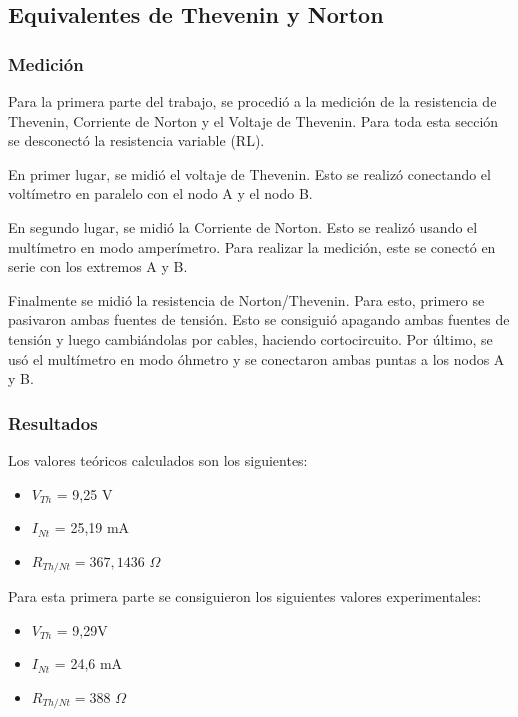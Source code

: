 \documentclass{article}
\begin{document}
        \subsection{Equivalentes de Thevenin y Norton}
            \subsubsection{Medición}
                \quad Para la primera parte del trabajo, se procedió a la medición de la resistencia de Thevenin, Corriente de Norton y el Voltaje de Thevenin. Para toda esta sección se desconectó la resistencia variable (RL).\par
                En primer lugar, se midió el voltaje de Thevenin. Esto se realizó conectando el voltímetro en paralelo con el nodo A y el nodo B.\par
                En segundo lugar, se midió la Corriente de Norton. Esto se realizó usando el multímetro en modo amperímetro. Para realizar la medición, este se conectó en serie con los extremos A y B. \par
                Finalmente se midió la resistencia de Norton/Thevenin. Para esto, primero se  pasivaron ambas fuentes de tensión. Esto se consiguió apagando ambas fuentes de tensión y luego cambiándolas por cables, haciendo cortocircuito. Por último, se usó el multímetro en modo óhmetro y se conectaron ambas puntas a los nodos A y B.\par

            \subsubsection{Resultados}

                \quad Los valores teóricos calculados son los siguientes:
            	\begin{itemize}
                \item $V_{Th}$ = 9,25 V
                \item $I_{Nt}$ = 25,19 mA
                \item $R_{Th/Nt} = 367,1436$ $\Omega$
                \end{itemize}

                \quad Para esta primera parte se consiguieron los siguientes valores experimentales:
            	\begin{itemize}
                \item $V_{Th}$ = 9,29V
                \item $I_{Nt}$ = 24,6 mA
                \item $R_{Th/Nt} = 388$ $\Omega$
                \end{itemize}
\end{document}
